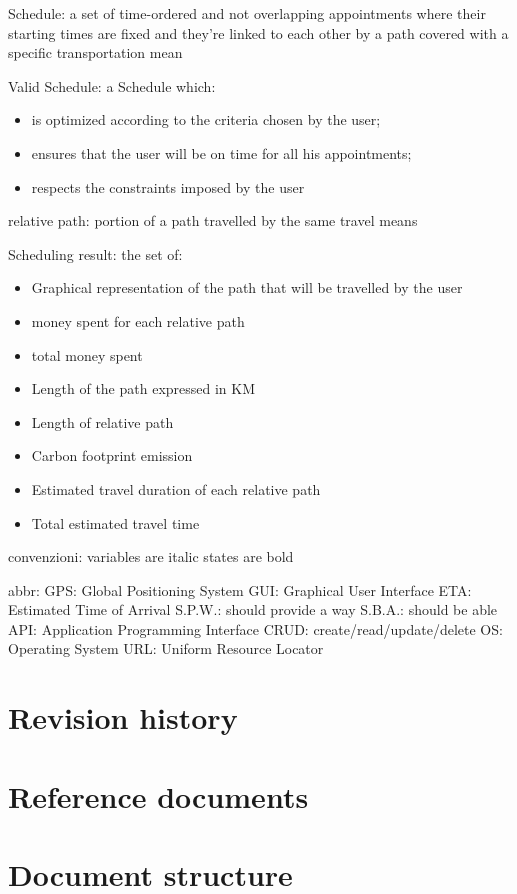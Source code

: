 Schedule: a set of time-ordered and not overlapping appointments where their starting times are fixed and they're linked to each other by a path covered with a specific transportation mean

Valid Schedule: a Schedule which:
\begin{itemize}
\item is optimized according to the criteria chosen by the user;
\item ensures that the user will be on time for all his appointments;
\item respects the constraints imposed by the user
\end{itemize}

relative path: portion of a path travelled by the same travel means 

Scheduling result: the set of:
\begin{itemize}
\item Graphical representation of the path that will be travelled by the user
\item money spent for each relative path
\item total money spent 
\item Length of the path expressed in KM
\item Length of relative path 
\item Carbon footprint emission
\item Estimated travel duration of each relative path
\item Total estimated travel time
\end{itemize}

convenzioni:
variables are italic
states are bold

abbr:
GPS: Global Positioning System
GUI: Graphical User Interface
ETA: Estimated Time of Arrival
S.P.W.: should provide a way
S.B.A.: should be able 
API: Application Programming Interface
CRUD: create/read/update/delete
OS: Operating System
URL: Uniform Resource Locator


\section{Revision history}

\section{Reference documents}

\section{Document structure}